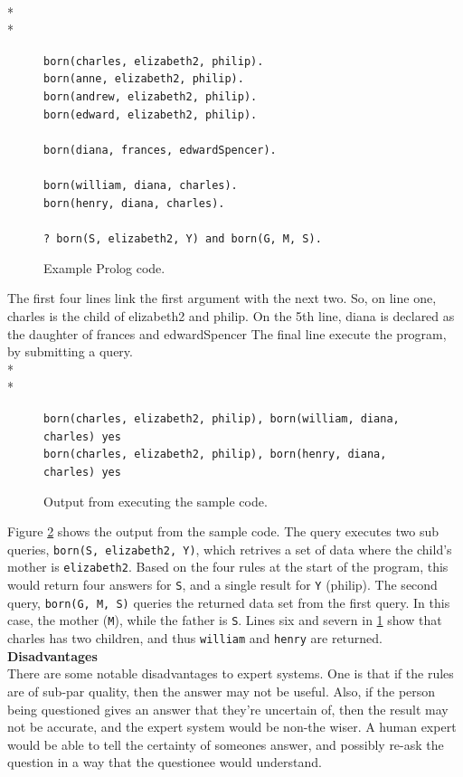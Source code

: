 \documentclass[12pt]{report}
\begin{document}
\\*
\\*
\begin{figure}[H]
\texttt{born(charles, elizabeth2, philip).\\
born(anne,    elizabeth2, philip).\\
born(andrew,  elizabeth2, philip).\\
born(edward,  elizabeth2, philip).\\
\\
born(diana,   frances,    edwardSpencer).\\
\\
born(william, diana,      charles).\\
born(henry,   diana,      charles).\\
\\
? born(S, elizabeth2, Y) and born(G, M, S).}
\caption{Example Prolog code.}
\label{fig:prolog_code}
\end{figure}
The first four lines link the first argument with the next two.  So, on line one, charles is the child of elizabeth2 and philip.  On the 5th line, diana is declared as the daughter of frances and edwardSpencer 
The final line execute the program, by submitting a query.
\\*
\\*
\begin{figure}[H]
\texttt{born(charles, elizabeth2, philip), born(william, diana, charles) yes\\
born(charles, elizabeth2, philip), born(henry, diana, charles) yes}
\caption{Output from executing the sample code.}
\label{fig:prolog_output}
\end{figure}
Figure \ref{fig:prolog_output} shows the output from the sample code.  The query executes two sub queries, \texttt{born(S, elizabeth2, Y)}, which retrives a set of data where the child's mother is \texttt{elizabeth2}.  Based on the four rules at the start of the program, this would return four answers for \texttt{S}, and a single result for \texttt{Y} (philip).  The second query, \texttt{born(G, M, S)} queries the returned data set from the first query.  In this case, the mother (\texttt{M}), while the father is \texttt{S}.  Lines six and severn in \ref{fig:prolog_code} show that charles has two children, and thus \texttt{william} and \texttt{henry} are returned.
\clearpage
\textbf{Disadvantages}\\
There are some notable disadvantages to expert systems.  One is that if the rules are of sub-par quality, then the answer may not be useful.  Also, if the person being questioned gives an answer that they're uncertain of, then the result may not be accurate, and the expert system would be non-the wiser.  A human expert would be able to tell the certainty of someones answer, and possibly re-ask the question in a way that the questionee would understand.
\end{document}
